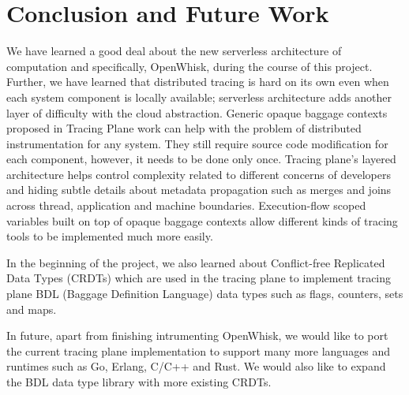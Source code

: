 \chapter{Conclusion and Future Work}

We have learned a good deal about the new serverless architecture of computation and specifically, OpenWhisk, during the course of this project. Further, we have learned that distributed tracing is hard on its own even when each system component is locally available; serverless architecture adds another layer of difficulty with the cloud abstraction. Generic opaque baggage contexts proposed in Tracing Plane work can help with the problem of distributed instrumentation for any system. They still require source code modification for each component, however, it needs to be done only once. Tracing plane's layered architecture helps control complexity related to different concerns of developers and hiding subtle details about metadata propagation such as merges and joins across thread, application and machine boundaries. Execution-flow scoped variables built on top of opaque baggage contexts allow different kinds of tracing tools to be implemented much more easily.

In the beginning of the project, we also learned about Conflict-free Replicated Data Types (CRDTs)\cite{Shapiro:2011:CRD:2050613.2050642} which are used in the tracing plane to implement tracing plane BDL (Baggage Definition Language) data types such as flags, counters, sets and maps.

In future, apart from finishing intrumenting OpenWhisk, we would like to port the current tracing plane implementation to support many more languages and runtimes such as Go, Erlang, C/C++ and Rust. We would also like to expand the BDL data type library with more existing CRDTs\cite{shapiro:inria-00555588}.
